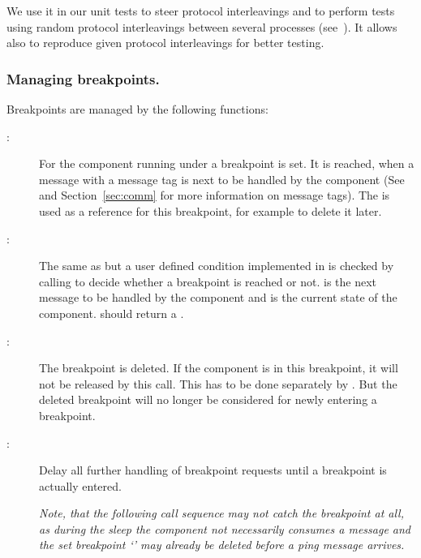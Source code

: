 We use it in our unit tests to steer protocol interleavings and to perform
tests using random protocol interleavings between several processes
(see~). It allows also to reproduce given protocol
interleavings for better testing.

\subsubsection{Managing breakpoints.}

Breakpoints are managed by the following functions:

\begin{description}
\item[:] For the
  component running under  a breakpoint  is set. It
  is reached, when a message with a message tag  is next to be
  handled by the component (See  and
  Section~\ref{sec:comm} for more information on message tags). The
   is used as a reference for this breakpoint, for example to
  delete it later.
\item[:]
  The same as  but a user defined
  condition implemented in  is
  checked by calling  to decide
  whether a breakpoint is reached or not.  is the next message
  to be handled by the component and  is the current state of
  the component.  should return a .
\item[:] The breakpoint
   is deleted. If the component is in this breakpoint, it will
  not be released by this call. This has to be done separately by
  . But the deleted breakpoint will no
  longer be considered for newly entering a breakpoint.
\item[:]
  Delay all further handling of breakpoint requests until a breakpoint is
  actually entered.

  \emph{Note, that the following call sequence may not catch the breakpoint at
  all, as during the sleep the component not necessarily consumes a
   message and the set breakpoint `' may already
  be deleted before a ping message arrives.}


\end{description}
